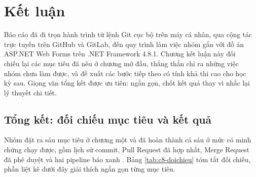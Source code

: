 \section{Kết luận}

Báo cáo đã đi trọn hành trình từ lệnh Git cục bộ trên máy cá nhân, qua cộng tác trực tuyến trên GitHub và GitLab, đến quy trình làm việc nhóm gắn với đồ án ASP.NET Web Forms trên .NET Framework 4.8.1.
Chương kết luận này đối chiếu lại các mục tiêu đã nêu ở chương mở đầu, thẳng thắn chỉ ra những việc nhóm chưa làm được, và đề xuất các bước tiếp theo có tính khả thi cao cho học kỳ sau.
Giọng văn tổng kết được ưu tiên: ngắn gọn, chốt kết quả thay vì nhắc lại lý thuyết chi tiết.

\subsection{Tổng kết: đối chiếu mục tiêu và kết quả}

Nhóm đặt ra sáu mục tiêu ở chương một và đã hoàn thành cả sáu ở mức có minh chứng chạy được, gồm lịch sử commit, Pull Request đã hợp nhất, Merge Request đã phê duyệt và hai pipeline báo xanh \cite{progit,githubdocs,gitlabdocs}.
Bảng \ref{tab:c8-doichieu} tóm tắt đối chiếu, phần liệt kê dưới đây giải thích ngắn gọn từng mục tiêu.

